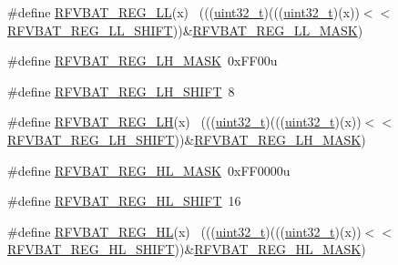 \begin{DoxyCompactItemize}
\item 
\#define \hyperlink{group___r_f_v_b_a_t___register___masks_ga113d3d8df5cf04d594707c9a9df4ea8c}{R\+F\+V\+B\+A\+T\+\_\+\+R\+E\+G\+\_\+\+LL}(x)                                              ~(((\hyperlink{_p_e___types_8h_a33594304e786b158f3fb30289278f5af}{uint32\+\_\+t})(((\hyperlink{_p_e___types_8h_a33594304e786b158f3fb30289278f5af}{uint32\+\_\+t})(x))$<$$<$\hyperlink{group___r_f_v_b_a_t___register___masks_ga77fdef5edef0e9e20236761366ed3fbb}{R\+F\+V\+B\+A\+T\+\_\+\+R\+E\+G\+\_\+\+L\+L\+\_\+\+S\+H\+I\+FT}))\&\hyperlink{group___r_f_v_b_a_t___register___masks_gac055aaeebf0ff5200e7b3703d6a6ed73}{R\+F\+V\+B\+A\+T\+\_\+\+R\+E\+G\+\_\+\+L\+L\+\_\+\+M\+A\+SK})
\item 
\#define \hyperlink{group___r_f_v_b_a_t___register___masks_gaac2f9a56be08c02d917e25d2160bb25d}{R\+F\+V\+B\+A\+T\+\_\+\+R\+E\+G\+\_\+\+L\+H\+\_\+\+M\+A\+SK}~0x\+F\+F00u
\item 
\#define \hyperlink{group___r_f_v_b_a_t___register___masks_ga274af8b911ddd78c1ce6df899ad83cbd}{R\+F\+V\+B\+A\+T\+\_\+\+R\+E\+G\+\_\+\+L\+H\+\_\+\+S\+H\+I\+FT}~8
\item 
\#define \hyperlink{group___r_f_v_b_a_t___register___masks_ga551abab9c745a2fdca59aa0f68abef21}{R\+F\+V\+B\+A\+T\+\_\+\+R\+E\+G\+\_\+\+LH}(x)                                              ~(((\hyperlink{_p_e___types_8h_a33594304e786b158f3fb30289278f5af}{uint32\+\_\+t})(((\hyperlink{_p_e___types_8h_a33594304e786b158f3fb30289278f5af}{uint32\+\_\+t})(x))$<$$<$\hyperlink{group___r_f_v_b_a_t___register___masks_ga274af8b911ddd78c1ce6df899ad83cbd}{R\+F\+V\+B\+A\+T\+\_\+\+R\+E\+G\+\_\+\+L\+H\+\_\+\+S\+H\+I\+FT}))\&\hyperlink{group___r_f_v_b_a_t___register___masks_gaac2f9a56be08c02d917e25d2160bb25d}{R\+F\+V\+B\+A\+T\+\_\+\+R\+E\+G\+\_\+\+L\+H\+\_\+\+M\+A\+SK})
\item 
\#define \hyperlink{group___r_f_v_b_a_t___register___masks_gae0f69a55f5feaf1e41b317aaa17780fe}{R\+F\+V\+B\+A\+T\+\_\+\+R\+E\+G\+\_\+\+H\+L\+\_\+\+M\+A\+SK}~0x\+F\+F0000u
\item 
\#define \hyperlink{group___r_f_v_b_a_t___register___masks_ga069a18ff685d5c1e8e48acc77454bf70}{R\+F\+V\+B\+A\+T\+\_\+\+R\+E\+G\+\_\+\+H\+L\+\_\+\+S\+H\+I\+FT}~16
\item 
\#define \hyperlink{group___r_f_v_b_a_t___register___masks_gae16222d2b2ede79d199afaa5da47f0f5}{R\+F\+V\+B\+A\+T\+\_\+\+R\+E\+G\+\_\+\+HL}(x)                                              ~(((\hyperlink{_p_e___types_8h_a33594304e786b158f3fb30289278f5af}{uint32\+\_\+t})(((\hyperlink{_p_e___types_8h_a33594304e786b158f3fb30289278f5af}{uint32\+\_\+t})(x))$<$$<$\hyperlink{group___r_f_v_b_a_t___register___masks_ga069a18ff685d5c1e8e48acc77454bf70}{R\+F\+V\+B\+A\+T\+\_\+\+R\+E\+G\+\_\+\+H\+L\+\_\+\+S\+H\+I\+FT}))\&\hyperlink{group___r_f_v_b_a_t___register___masks_gae0f69a55f5feaf1e41b317aaa17780fe}{R\+F\+V\+B\+A\+T\+\_\+\+R\+E\+G\+\_\+\+H\+L\+\_\+\+M\+A\+SK})
$$
\end{DoxyCompactItemize}
